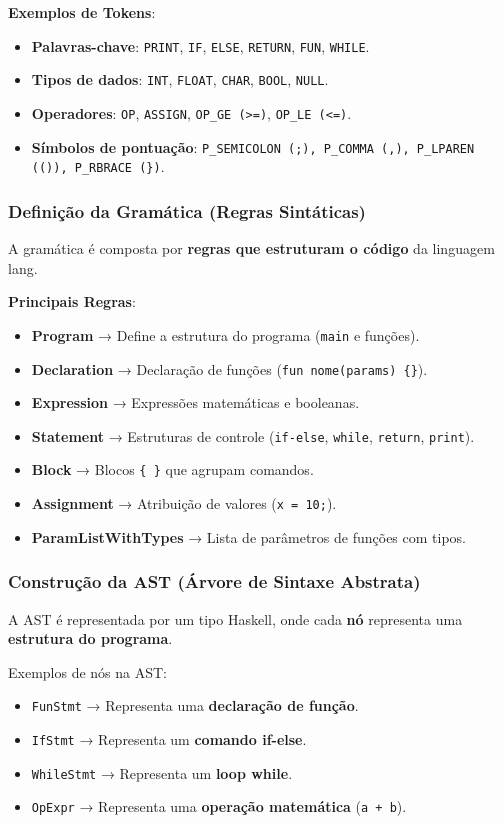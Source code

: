 \documentclass{article}
\begin{document}
\textbf{Exemplos de Tokens}:
\begin{itemize}
    \item \textbf{Palavras-chave}: \texttt{PRINT}, \texttt{IF}, \texttt{ELSE}, \texttt{RETURN}, \texttt{FUN}, \texttt{WHILE}.
    \item \textbf{Tipos de dados}: \texttt{INT}, \texttt{FLOAT}, \texttt{CHAR}, \texttt{BOOL}, \texttt{NULL}.
    \item \textbf{Operadores}: \texttt{OP}, \texttt{ASSIGN}, \texttt{OP\_GE (>=)}, \texttt{OP\_LE (<=)}.
    \item \textbf{Símbolos de pontuação}: \texttt{P\_SEMICOLON (;), P\_COMMA (,), P\_LPAREN (()), P\_RBRACE (\})}.
\end{itemize}

\subsubsection{Definição da Gramática (Regras Sintáticas)}
A gramática é composta por \textbf{regras que estruturam o código} da linguagem lang.

\textbf{Principais Regras}:
\begin{itemize}
    \item \textbf{Program} → Define a estrutura do programa (\texttt{main} e funções).
    \item \textbf{Declaration} → Declaração de funções (\texttt{fun nome(params) \{\}}).
    \item \textbf{Expression} → Expressões matemáticas e booleanas.
    \item \textbf{Statement} → Estruturas de controle (\texttt{if-else}, \texttt{while}, \texttt{return}, \texttt{print}).
    \item \textbf{Block} → Blocos \texttt{\{ \}} que agrupam comandos.
    \item \textbf{Assignment} → Atribuição de valores (\texttt{x = 10;}).
    \item \textbf{ParamListWithTypes} → Lista de parâmetros de funções com tipos.
\end{itemize}

\subsubsection{Construção da AST (Árvore de Sintaxe Abstrata)}
A AST é representada por um tipo Haskell, onde cada \textbf{nó} representa uma \textbf{estrutura do programa}.

Exemplos de nós na AST:
\begin{itemize}
    \item \texttt{FunStmt} → Representa uma \textbf{declaração de função}.
    \item \texttt{IfStmt} → Representa um \textbf{comando if-else}.
    \item \texttt{WhileStmt} → Representa um \textbf{loop while}.
    \item \texttt{OpExpr} → Representa uma \textbf{operação matemática} (\texttt{a + b}).
\end{itemize}
\end{document}
